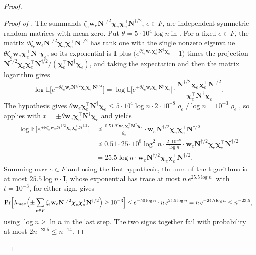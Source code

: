 \documentclass[11pt]{article}
\theoremstyle{remark}
\newcommand{\cchi}{{\boldsymbol\chi}}
\newcommand{\II}{\mathbf I}
\newcommand{\NN}{\mathbf N}
\newcommand{\ww}{\mathbf w}
\newcommand{\defeq}{\coloneqq}
\newcommand{\Ex}{\mathbb E}
\begin{document}
\begin{proof}
\begin{proof}[Proof of ]
The summands $\zeta_e\ww_e\NN^{\dag/2}\cchi_e\cchi_e^{\top}\NN^{\dag/2}$,
$e\in F$, are independent symmetric random matrices with mean zero.
Put $\theta\defeq5\cdot10^{4}\log n$ in .
For a fixed $e\in F$, the matrix
$\theta\zeta_e\ww_e\NN^{\dag/2}\cchi_e\cchi_e^{\top}\NN^{\dag/2}$ has rank
one with the single nonzero eigenvalue
$\theta\zeta_e\ww_e\cchi_e^{\top}\NN^{\dag}\cchi_e$, so its exponential is
$\II$ plus
$\bigl(e^{\theta\zeta_e\ww_e\cchi_e^{\top}\NN^{\dag}\cchi_e}-1\bigr)$ times
the projection
$\NN^{\dag/2}\cchi_e\cchi_e^{\top}\NN^{\dag/2}
/(\cchi_e^{\top}\NN^{\dag}\cchi_e)$,
and taking the expectation and then the matrix logarithm gives
\[
\log\Ex\bigl[e^{\pm\theta\zeta_e\ww_e\NN^{\dag/2}\cchi_e\cchi_e^{\top}
\NN^{\dag/2}}\bigr]
=\log\Ex\bigl[e^{\pm\theta\zeta_e\ww_e\cchi_e^{\top}\NN^{\dag}\cchi_e}\bigr]
\cdot\frac{\NN^{\dag/2}\cchi_e\cchi_e^{\top}\NN^{\dag/2}}
{\cchi_e^{\top}\NN^{\dag}\cchi_e}.
\]
The hypothesis gives
$\theta\ww_e\cchi_e^{\top}\NN^{\dag}\cchi_e
\le5\cdot10^{4}\log n\cdot2\cdot10^{-8}\varrho_e/\log n=10^{-3}\varrho_e$,
so  applies with $x=\pm\theta\ww_e\cchi_e^{\top}\NN^{\dag}\cchi_e$
and yields
\begin{align*}
\log\Ex\bigl[e^{\pm\theta\zeta_e\ww_e\NN^{\dag/2}\cchi_e\cchi_e^{\top}
\NN^{\dag/2}}\bigr]
&\preceq\frac{0.51\,\theta^{2}\ww_e\cchi_e^{\top}\NN^{\dag}\cchi_e}{\varrho_e}
\cdot\ww_e\NN^{\dag/2}\cchi_e\cchi_e^{\top}\NN^{\dag/2}\\
&\preceq0.51\cdot25\cdot10^{8}\log^{2}n\cdot\frac{2\cdot10^{-8}}{\log n}
\cdot\ww_e\NN^{\dag/2}\cchi_e\cchi_e^{\top}\NN^{\dag/2}\\
&=25.5\log n\cdot\ww_e\NN^{\dag/2}\cchi_e\cchi_e^{\top}\NN^{\dag/2}.
\end{align*}
Summing over $e\in F$ and using the first hypothesis, the sum of the
logarithms is at most $25.5\log n\cdot\II$, whose exponential has trace at
most $n\,e^{25.5\log n}$.
 with $t=10^{-3}$, for either sign, gives
\[
\Pr\Bigl[\lambda_{\max}\Bigl(\pm\sum_{e\in F}\zeta_e\ww_e\NN^{\dag/2}
\cchi_e\cchi_e^{\top}\NN^{\dag/2}\Bigr)\ge10^{-3}\Bigr]
\le e^{-50\log n}\cdot n\,e^{25.5\log n}
=n\,e^{-24.5\log n}\le n^{-23.5},
\]
using $\log n\ge\ln n$ in the last step.
The two signs together fail with probability at most
$2n^{-23.5}\le n^{-14}$.
\end{proof}


\end{proof}
\end{document}
